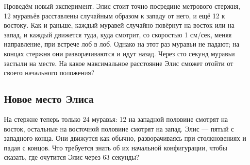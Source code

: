 Проведём новый эксперимент.
Элис стоит точно посредине метрового стержня, 12 муравьёв расставлены случайным образом к западу от него, и ещё 12 к востоку.
Как и раньше, каждый муравей случайно повёрнут на восток или на запад, и каждый движется туда, куда смотрит, со скоростью 1 см/сек, меняя направление, при встрече лоб в лоб.
Однако на этот раз муравьи не падают;  
на концах стержня они разворачиваются и идут назад.
Через сто секунд муравьи застыли на месте.
На какое максимальное расстояние Элис сможет отойти от своего начального положения?

\subsection*{Новое место Элиса}

На стержне теперь только 24 муравья:
12 на западной половине смотрят на восток,
остальные на восточной половине смотрят на запад.
Элис --- пятый с западного конца.
Они движутся как обычно, разворачиваясь при столкновениях и падая с концов.
Что требуется знать об их начальной конфигурации, чтобы сказать, где очутится Элис через 63 секунды?
